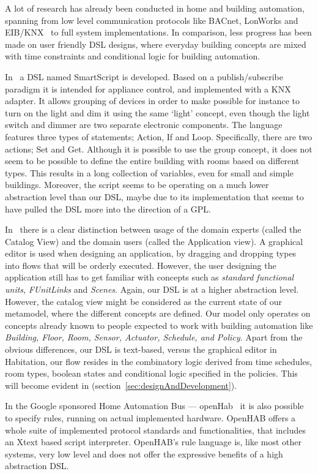 A lot of research has already been conducted in home and building automation, spanning from low level communication protocols like BACnet, LonWorks and EIB/KNX~\cite{communication} to full system implementations. In comparison, less progress has been made on user friendly DSL designs, where everyday building concepts are mixed with time constraints and conditional logic for building automation. 

In~\cite{smartscript} a DSL named SmartScript is developed. Based on a publish/subscribe paradigm it is intended for appliance control, and implemented with a KNX adapter. It allows grouping of devices in order to make possible for instance to turn on the light and dim it using the same `light' concept, even though the light switch and dimmer are two separate electronic components. The language features three types of statements; Action, If and Loop. Specifically, there are two actions; Set and Get. Although it is possible to use the group concept, it does not seem to be possible to define the entire building with rooms based on different types. This results in a long collection of variables, even for small and simple buildings. Moreover, the script seems to be operating on a much lower abstraction level than our DSL, maybe due to its implementation that seems to have pulled the DSL more into the direction of a GPL. 

In~\cite{habitation} there is a clear distinction between usage of the domain experts (called the Catalog View) and the domain users (called the Application view). A graphical editor is used when designing an application, by dragging and dropping types into flows that will be orderly executed. However, the user designing the application still has to get familiar with concepts such as \textit{standard functional units}, \textit{FUnitLinks} and \textit{Scenes}. Again, our DSL is at a higher abstraction level. However, the catalog view might be considered as the current state of our metamodel, where the different concepts are defined. Our model only operates on concepts already known to people expected to work with building automation like \textit{Building, Floor, Room, Sensor, Actuator, Schedule, and Policy}. Apart from the obvious differences, our DSL is text-based, versus the graphical editor in Habitation, our flow resides in the combinatory logic derived from time schedules, room types, boolean states and conditional logic specified in the policies. This will become evident in  (section~\ref{sec:designAndDevelopment}).

In the Google sponsored Home Automation Bus --- openHab~\cite{openhab} it is also possible to specify rules, running on actual implemented hardware. OpenHAB offers a whole suite of implemented protocol standards and functionalities, that includes an Xtext based script interpreter. OpenHAB's rule language is, like most other systems, very low level and does not offer the expressive benefits of a high abstraction DSL.